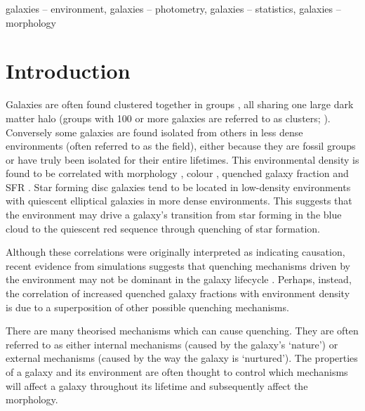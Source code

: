\documentclass[useAMS,usenatbib]{mn2e}
\begin{document}
\begin{keywords}
galaxies -- environment, galaxies -- photometry, galaxies -- statistics, galaxies -- morphology
\end{keywords}


\section{Introduction}\label{sec:intro}

Galaxies are often found clustered together in groups \citep{zwicky38, zwicky52, abell58}, all sharing one large dark matter halo (groups with 100 or more galaxies are referred to as clusters; \citealt{bower04}). Conversely some galaxies are found isolated from others in less dense environments (often referred to as the field), either because they are fossil groups \citep[where all members have eventually merged;][]{ponman94, jones00, jones03} or have truly been isolated for their entire lifetimes. This environmental density is found to be correlated with morphology \citep{dressler80, smail97, poggianti99, postman05, Bamford09}, colour \citep{butcher78, pimbblet02}, quenched galaxy fraction \citep{kauffmann03, Baldry06, peng12, darvish16} and SFR \citep{gomez03}. Star forming disc galaxies tend to be located in low-density environments with quiescent elliptical galaxies in more dense environments. This suggests that the environment may drive a galaxy's transition from star forming in the blue cloud to the quiescent red sequence through quenching of star formation. 
 
Although these correlations were originally interpreted as indicating causation, recent evidence from simulations suggests that quenching mechanisms driven by the environment may not be dominant in the galaxy lifecycle \citep{kimm09, kimm11, hirschmann14, wang14, phillips15, emerick16, fillingham16}. Perhaps, instead, the correlation of increased quenched galaxy fractions with environment density is due to a superposition of other possible quenching mechanisms.

There are many theorised mechanisms which can cause quenching. They are often referred to as either internal mechanisms (caused by the galaxy's `nature') or external mechanisms (caused by the way the galaxy is `nurtured'). The properties of a galaxy and its environment are often thought to control which mechanisms will affect a galaxy throughout its lifetime and subsequently affect the morphology. 
\end{document}

